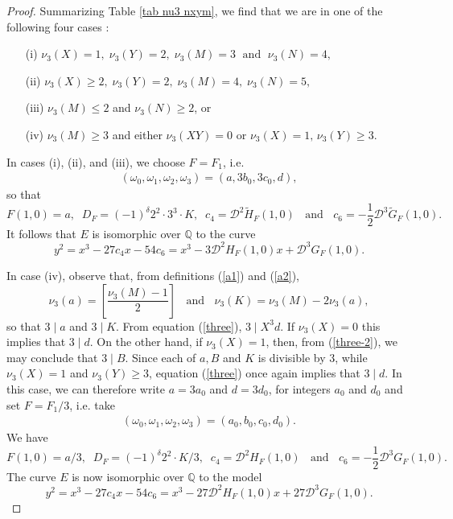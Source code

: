 \begin{proof}
Summarizing Table \ref{tab nu3 nxym},  we find that we are in one of the following four cases :

\begin{enumerate}
\item[(i)] $\nu_3 (X)=1, \;  \nu_3(Y) =2,  \; \nu_3(M)=3 \; \mbox{ and } \;  \nu_3(N)=4,$
\item[(ii)] $\nu_3(X) \geq 2, \;  \nu_3(Y) =2, \; \nu_3(M) =4, \; \nu_3(N)=5,$
\item[(iii)] $\nu_3(M) \leq 2 $ and $ \nu_3(N) \geq 2$, or
\item[(iv)] $\nu_3 (M)  \geq 3$ and either $\nu_3 (XY)=0 $ or $\nu_3(X)=1, \,  \nu_3(Y) \geq 3$.
\end{enumerate}
In cases (i), (ii), and (iii), we choose $F=F_1$, i.e.
\begin{align*}
(\omega_0,\omega_1,\omega_2,\omega_3) = (a, 3 b_0, 3 c_0, d),
\end{align*}
so that
$$
F(1,0)=a, \; \; D_{F} = (-1)^\delta 2^2 \cdot 3^3 \cdot K, \; \; 
c_4 = \mathcal{D}^2 \widetilde{H}_{F} (1,0) \; \; \mbox{ and } \; \; 
c_6 = - \frac{1}{2}  \mathcal{D}^3 \widetilde{G}_{F} (1,0).
$$
It follows that $E$ is isomorphic over $\mathbb{Q}$ to the curve
$$
y^2 = x^3 -27 c_4 x -54 c_6 = x^3 - 3 \mathcal{D}^2 H_{F}(1,0) x + \mathcal{D}^3 G_{F}(1,0).
$$

In  case (iv), observe that, from definitions (\ref{a1}) and (\ref{a2}),
\begin{equation} \label{foster}
\nu_3(a) = \left[ \frac{\nu_3(M)-1}{2} \right] \; \; \mbox{ and } \; \; 
\nu_3(K) = \nu_3(M) - 2 \nu_3 (a),
\end{equation}
so that $3 \mid a$ and $3 \mid K$. From equation (\ref{three}),  $3 \mid X^3 d$.
If $\nu_3(X)=0$ this implies that $3 \mid d$. On the other hand, 
if $\nu_3(X)=1$, then, from (\ref{three-2}), we may conclude that $3 \mid B$. Since each of $a, B$ and $K$ is divisible by $3$, while $\nu_3 (X) =1$ and $\nu_3 (Y) \geq 3$,  equation (\ref{three})
once again implies that $3 \mid d$.
In this case, we can therefore write $a = 3a_0$ and $d=3d_0$, for integers $a_0$ and $d_0$ and 
set $F = F_1/3$, i.e. take
\begin{align*}
(\omega_0,\omega_1,\omega_2,\omega_3) = (a_0, b_0, c_0, d_0).
\end{align*}
We have
$$
F(1,0) =a/3, \; \;  D_{F}  = (-1)^\delta 2^2  \cdot K/3, \; \; 
c_4 = \mathcal{D}^2 H_{F} (1,0)  \; \; \mbox{ and } \; \;  
c_6 = - \frac{1}{2}  \mathcal{D}^3 G_{F} (1,0).
$$
The curve $E$ is now isomorphic over $\mathbb{Q}$ to the model
$$
y^2 = x^3 -27 c_4 x -54 c_6 = x^3 - 27 \mathcal{D}^2 H_{F}(1,0) x + 27 \mathcal{D}^3 G_{F}(1,0).
$$


\end{proof}
